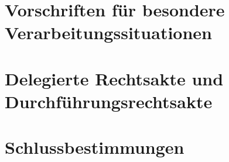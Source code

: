 \part{Vorschriften für besondere Verarbeitungssituationen}
\label{part:9}








\part{Delegierte Rechtsakte und Durchführungsrechtsakte}
\label{part:10}



\part{Schlussbestimmungen}
\label{part:11}







